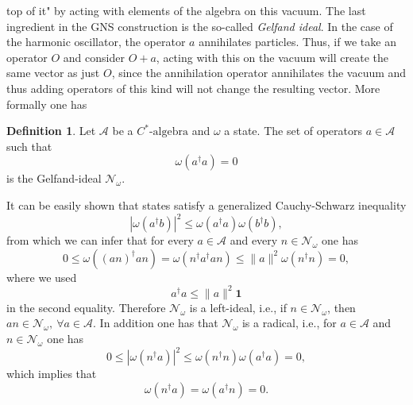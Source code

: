 \documentclass[aps,pra,reprint,superscriptaddress]{revtex4-2}
\newcommand{\cA}{{\mathcal A}}
\newcommand{\cN}{{\mathcal N}}
\newcommand\w{\omega}
\newcommand{\id}{\mathbf 1}
\providecommand{\norm}[1]{\lVert #1\rVert}
\theoremstyle{definition}
\newtheorem{definition}[theorem]{Definition}
\theoremstyle{remark}
\begin{document}
top of it" by acting with elements of the algebra on this vacuum. 
The last ingredient in the GNS construction
is the so-called \emph{Gelfand ideal}. In the case of the harmonic
oscillator, the operator $a$ annihilates particles. Thus, if we take an
operator $O$ and consider $O + a$, acting with this on the vacuum will create
the same vector as just $O$, since the annihilation operator annihilates the vacuum and thus adding operators of this kind will not change the resulting
vector. More formally one has 
\begin{definition}
    Let $\cA$ be a $C^\ast\text{-algebra}$ and $\w$ a state. The set of
    operators $a \in \cA$ such that 
    \begin{equation}
        \w(a^\dagger a) = 0
    \end{equation}
    is the Gelfand-ideal $\cN_\w$.
\end{definition}
It can be easily shown that states satisfy a generalized Cauchy-Schwarz
inequality
\begin{equation}
    |\w(a^\dagger b)|^2 \leq \w(a^\dagger a) \w(b^\dagger b),
\end{equation}
from which we can infer that for every $a \in \cA$ and every $n \in \cN_\w$ one
has 
\begin{equation}
    0 \leq \w((an)^\dagger an) = \w(n^\dagger a^\dagger a n) \leq \norm{a}^2
    \w(n^\dagger n) = 0,
\end{equation}
where we used 
\begin{equation}
    a^\dagger a \leq \norm{a}^2 \id
\end{equation}
in the second equality. Therefore $\cN_\w$ is a left-ideal, i.e., if $n \in
\cN_\w$, then $an \in \cN_\w,\ \forall a \in \cA$.
In addition one has that $\cN_\w$ is a radical, i.e., for $a \in \cA$ and $n \in
\cN_\w$ one has 
\begin{equation}
    0 \leq |\w(n^\dagger a)|^2 \leq \w(n^\dagger n) \w(a^\dagger a) = 0,
\end{equation}
which implies that 
\begin{equation}\label{eq:radical}
    \w(n^\dagger a) = \w(a^\dagger n) = 0.
\end{equation}
\end{document}

